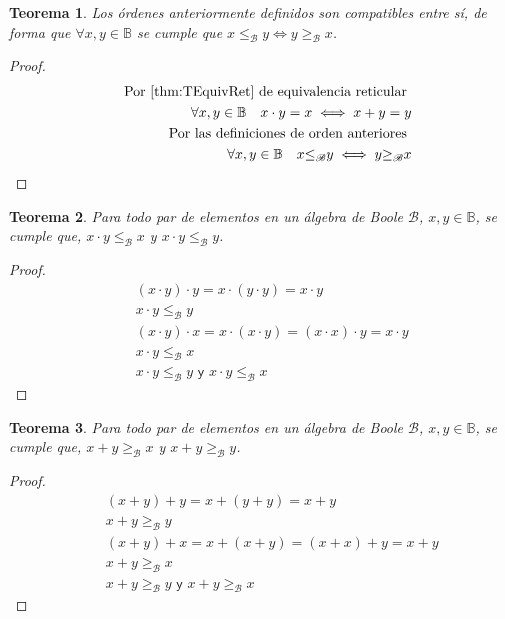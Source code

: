 \documentclass[final,12pt,a4paper,twoside,fleqn]{extbook}
\newcommand{\setB}{\ensuremath{\mathbb{B}}}
\newcommand{\algB}{\ensuremath{\mathscr{B}}}
\newcommand{\leqB}{\ensuremath{{\leq}_{\algB}}}
\newcommand{\geqB}{\ensuremath{{\geq}_{\algB}}}
\newtheorem{thm}{Teorema}[chapter]
\theoremstyle{definition}
\theoremstyle{remark}
\begin{document}
\begin{thm}
Los órdenes anteriormente definidos son compatibles entre sí, de forma que \(
\forall x,y \in \setB \) se cumple que \( x \leqB y \iff y
\geqB x \).
\end{thm}



\begin{proof}
\begin{eqnarray}
\nonumber
&&\text{Por \ref{thm:TEquivRet} de equivalencia reticular }\\
&&\forall x,y \in \setB \quad x \cdot y = x \iff x + y = y\\ \nonumber
&&\text{Por las definiciones de orden anteriores }\\
&&\forall x,y \in \setB \quad x \leqB y \iff y \geqB x
\end{eqnarray}
\end{proof}



\begin{thm}
Para todo par de elementos en un álgebra de Boole \(\algB\), \(x,y \in
\setB\), se cumple que, \(x\cdot y \leqB x\) y \(x\cdot y \leqB
y\).
\end{thm}



\begin{proof}
\begin{eqnarray}
&& (x \cdot y) \cdot y = x \cdot (y \cdot y) = x \cdot y\\
&& x \cdot y \leqB y\\
&& (x \cdot y) \cdot x = x \cdot (x \cdot y) = (x \cdot x) \cdot y = x \cdot
y\\
&& x \cdot y \leqB x\\
&& x \cdot y \leqB y \textsf{  y  } x \cdot y \leqB x
\end{eqnarray}
\end{proof}



\begin{thm}
Para todo par de elementos en un álgebra de Boole \( \algB \), \( x , y \in
\setB \), se cumple que, \( x + y \geqB x \) y \( x + y \geqB
y \).
\end{thm}



\begin{proof}
\begin{eqnarray}
&& (x + y) + y = x + (y + y) = x + y\\
&& x + y \geqB y\\
&& (x + y) + x = x + (x + y) = (x + x) + y = x + y\\
&& x + y \geqB x\\
&& x + y \geqB y \textsf{  y  } x + y \geqB x
\end{eqnarray}
\end{proof}
\end{document}
